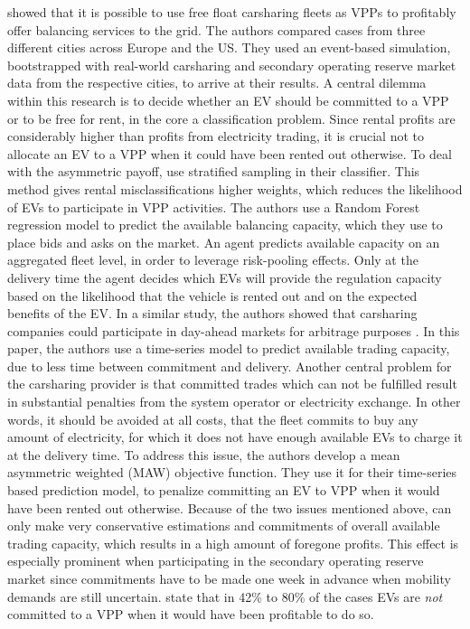 \documentclass[12pt, article]{article}
\begin{document}
\textcite{kahlen17_fleet} showed that it is possible to use free float carsharing
fleets as VPPs to profitably offer balancing services to the grid. The authors
compared cases from three different cities across Europe and the US. They used
an event-based simulation, bootstrapped with real-world carsharing and secondary
operating reserve market data from the respective cities, to arrive at their
results. A central dilemma within this research is to decide whether an EV
should be committed to a VPP or to be free for rent, in the core a
classification problem. Since rental profits are considerably higher than
profits from electricity trading, it is crucial not to allocate an EV to a VPP
when it could have been rented out otherwise. To deal with the asymmetric
payoff, \citeauthor{kahlen17_fleet} use stratified sampling in their classifier.
This method gives rental misclassifications higher weights, which reduces the
likelihood of EVs to participate in VPP activities. The authors use a Random
Forest regression model to predict the available balancing capacity, which they
use to place bids and asks on the market. An agent predicts available capacity
on an aggregated fleet level, in order to leverage risk-pooling effects. Only at
the delivery time the agent decides which EVs will provide the regulation
capacity based on the likelihood that the vehicle is rented out and on the
expected benefits of the EV. In a similar study, the authors showed that
carsharing companies could participate in day-ahead markets for arbitrage
purposes \parencite{kahlen18_elect_vehic_virtual_power_plant_dilem}. In this
paper, the authors use a time-series model to predict available trading
capacity, due to less time between commitment and delivery. Another central
problem for the carsharing provider is that committed trades which can not be
fulfilled result in substantial penalties from the system operator or
electricity exchange. In other words, it should be avoided at all costs, that
the fleet commits to buy any amount of electricity, for which it does not have
enough available EVs to charge it at the delivery time. To address this issue,
the authors develop a mean asymmetric weighted (MAW) objective function. They
use it for their time-series based prediction model, to penalize committing an
EV to VPP when it would have been rented out otherwise. Because of the two
issues mentioned above, \textcite{kahlen18_elect_vehic_virtual_power_plant_dilem}
can only make very conservative estimations and commitments of overall available
trading capacity, which results in a high amount of foregone profits. This
effect is especially prominent when participating in the secondary operating
reserve market since commitments have to be made one week in advance when
mobility demands are still uncertain. \textcite{kahlen17_fleet} state that in 42\%
to 80\% of the cases EVs are \emph{not} committed to a VPP when it would have been
profitable to do so.
\end{document}
